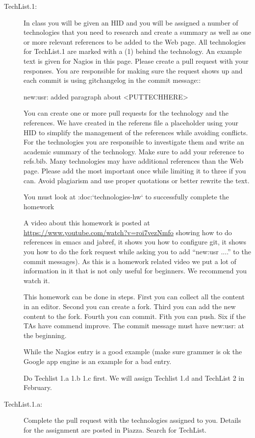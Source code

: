 {\begin{description}
\item[TechList.1:] In class you will be given an HID and you will be assigned
  a number of technologies that you need to research and create a
  summary as well as one or more relevant references to be added to the
  Web page. All technologies for TechList.1 are marked with a (1)
  behind the technology.  An example text is given for Nagios in this
  page.  Please create a pull request with your responses. You are
  responsible for making sure the request shows up and each commit is
  using gitchangelog in the commit message::

    new:usr: added paragraph about <PUTTECHHERE>

  You can create one or more pull requests for the technology and the
  references. We have created in the referens file a placeholder using
  your HID to simplify the management of the references while avoiding
  conflicts.  For the technologies you are responsible to investigate
  them and write an academic summary of the technology. Make sure to
  add your reference to refs.bib.  Many technologies may have
  additional references than the Web page. Please add the most
  important once while limiting it to three if you can. Avoid
  plagiarism and use proper quotations or better rewrite the text.

  You must look at :doc:`technologies-hw` to successfully complete the
  homework

  A video about this homework is posted at
  \url{https://www.youtube.com/watch?v=roi7vezNmfo} showing how to
  do references in emacs and jabref, it shows you how to configure
  git, it shows you how to do the fork request while asking you to add
  ``new:usr ....'' to the commit messages). As this is a homework
  related video we put a lot of information in it that is not only
  useful for beginners. We recommend you watch it.


  This homework can be done in steps. First you can collect all the
  content in an editor. Second you can create a fork. Third you can
  add the new content to the fork. Fourth you can commit. Fith you
  can push. Six if the TAs have commend improve. The commit message
  must have new:usr: at the beginning.

  While the Nagios entry is a good example (make sure grammer is ok
  the Google app engine is an example for a bad entry.

  Do Techlist 1.a 1.b 1.c first. We  will assign Techlist 1.d and
  TechList 2 in February.

\item[TechList.1.a:]  Complete the pull request with the technologies assigned to you.
  Details for the assignment are posted in Piazza. Search for TechList.


\end{description}}

